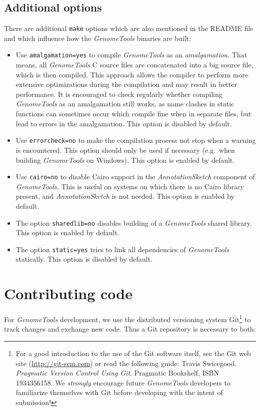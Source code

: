 \documentclass[11pt,final]{article}
\newcommand{\keyword}[1]{\lstinline{#1}}
\newcommand{\Gt}[0]{\emph{GenomeTools}\xspace}
\begin{document}
\subsection{Additional options}
There are additional \keyword{make} options which are also mentioned in the
README file and which influence how the \Gt binaries are built:
\begin{itemize}
\item
Use \keyword{amalgamation=yes} to compile \Gt as an \emph{amalgamation}. That
means, all \Gt C source files are concatenated into a big source file, which is
then compiled. This approach allows the compiler to perform more extensive
optimizations during the compilation and may result in better performance.
It is encouraged to check regularly whether compiling \Gt as an amalgamation
still works, as name clashes in static functions can sometimes occur which
compile fine when in separate files, but lead to errors in the amalgamation.
This option is disabled by default.
\item
Use \keyword{errorcheck=no} to make the compilation process not stop when a
warning is encountered. This option should only be used if necessary (e.g.\ when
building \Gt on Windows). This option is enabled by default.
\item
Use \keyword{cairo=no} to disable Cairo support in the \emph{AnnotationSketch}
component of \Gt . This is useful on systems on which there is no Cairo library
present, and \emph{AnnotationSketch} is not needed. This option is enabled by
default.
\item
The option \keyword{sharedlib=no} disables building of a \Gt shared library.
This option is enabled by default.
\item
The option \keyword{static=yes} tries to link all dependencies of \Gt
statically. This option is disabled by default.
\end{itemize}

\section{Contributing code}

For \Gt development, we use the distributed versioning system Git\footnote{For
a good introduction to the use of the Git software itself, see the Git web site
(\url{http://git-scm.com}) or read the following guide:
Travis Swicegood. \emph{Pragmatic Version Control Using Git}.
Pragmatic Bookshelf, ISBN 1934356158. We \emph{strongly} encourage future \Gt
developers to familiarize themselves with Git before developing with the intent
of submission!} to track changes and
exchange new code. Thus a Git repository is necessary to both:
\end{document}
